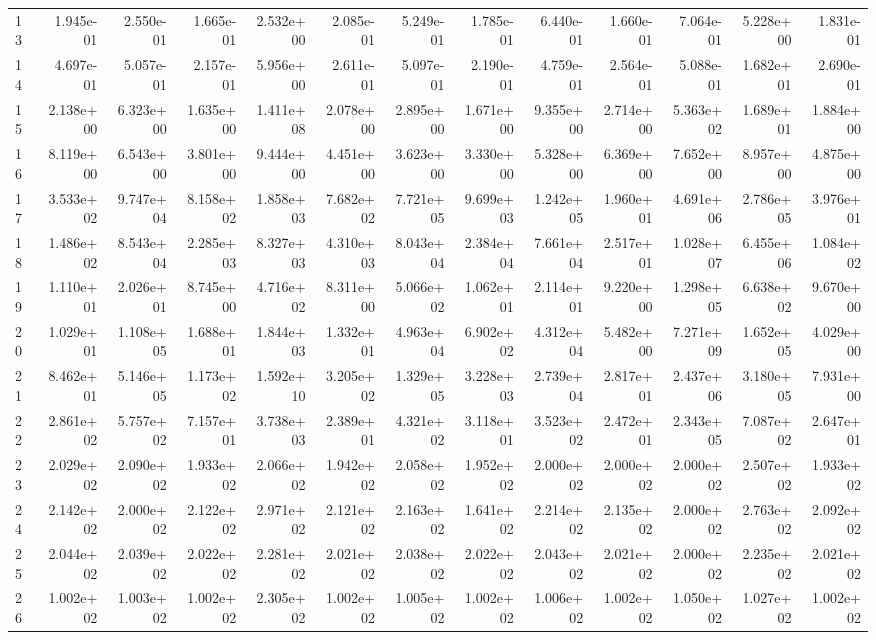\begin{table}
\begin{tabular}{lrrrrrrrrrrrr}
13 & 1.945e-01 & 2.550e-01 & 1.665e-01 & 2.532e+00 & 2.085e-01 & 5.249e-01 & 1.785e-01 & 6.440e-01 & 1.660e-01 & 7.064e-01 & 5.228e+00 & 1.831e-01 \\
14 & 4.697e-01 & 5.057e-01 & 2.157e-01 & 5.956e+00 & 2.611e-01 & 5.097e-01 & 2.190e-01 & 4.759e-01 & 2.564e-01 & 5.088e-01 & 1.682e+01 & 2.690e-01 \\
15 & 2.138e+00 & 6.323e+00 & 1.635e+00 & 1.411e+08 & 2.078e+00 & 2.895e+00 & 1.671e+00 & 9.355e+00 & 2.714e+00 & 5.363e+02 & 1.689e+01 & 1.884e+00 \\
16 & 8.119e+00 & 6.543e+00 & 3.801e+00 & 9.444e+00 & 4.451e+00 & 3.623e+00 & 3.330e+00 & 5.328e+00 & 6.369e+00 & 7.652e+00 & 8.957e+00 & 4.875e+00 \\
17 & 3.533e+02 & 9.747e+04 & 8.158e+02 & 1.858e+03 & 7.682e+02 & 7.721e+05 & 9.699e+03 & 1.242e+05 & 1.960e+01 & 4.691e+06 & 2.786e+05 & 3.976e+01 \\
18 & 1.486e+02 & 8.543e+04 & 2.285e+03 & 8.327e+03 & 4.310e+03 & 8.043e+04 & 2.384e+04 & 7.661e+04 & 2.517e+01 & 1.028e+07 & 6.455e+06 & 1.084e+02 \\
19 & 1.110e+01 & 2.026e+01 & 8.745e+00 & 4.716e+02 & 8.311e+00 & 5.066e+02 & 1.062e+01 & 2.114e+01 & 9.220e+00 & 1.298e+05 & 6.638e+02 & 9.670e+00 \\
20 & 1.029e+01 & 1.108e+05 & 1.688e+01 & 1.844e+03 & 1.332e+01 & 4.963e+04 & 6.902e+02 & 4.312e+04 & 5.482e+00 & 7.271e+09 & 1.652e+05 & 4.029e+00 \\
21 & 8.462e+01 & 5.146e+05 & 1.173e+02 & 1.592e+10 & 3.205e+02 & 1.329e+05 & 3.228e+03 & 2.739e+04 & 2.817e+01 & 2.437e+06 & 3.180e+05 & 7.931e+00 \\
22 & 2.861e+02 & 5.757e+02 & 7.157e+01 & 3.738e+03 & 2.389e+01 & 4.321e+02 & 3.118e+01 & 3.523e+02 & 2.472e+01 & 2.343e+05 & 7.087e+02 & 2.647e+01 \\
23 & 2.029e+02 & 2.090e+02 & 1.933e+02 & 2.066e+02 & 1.942e+02 & 2.058e+02 & 1.952e+02 & 2.000e+02 & 2.000e+02 & 2.000e+02 & 2.507e+02 & 1.933e+02 \\
24 & 2.142e+02 & 2.000e+02 & 2.122e+02 & 2.971e+02 & 2.121e+02 & 2.163e+02 & 1.641e+02 & 2.214e+02 & 2.135e+02 & 2.000e+02 & 2.763e+02 & 2.092e+02 \\
25 & 2.044e+02 & 2.039e+02 & 2.022e+02 & 2.281e+02 & 2.021e+02 & 2.038e+02 & 2.022e+02 & 2.043e+02 & 2.021e+02 & 2.000e+02 & 2.235e+02 & 2.021e+02 \\
26 & 1.002e+02 & 1.003e+02 & 1.002e+02 & 2.305e+02 & 1.002e+02 & 1.005e+02 & 1.002e+02 & 1.006e+02 & 1.002e+02 & 1.050e+02 & 1.027e+02 & 1.002e+02 \\

\end{tabular}
\end{table}
